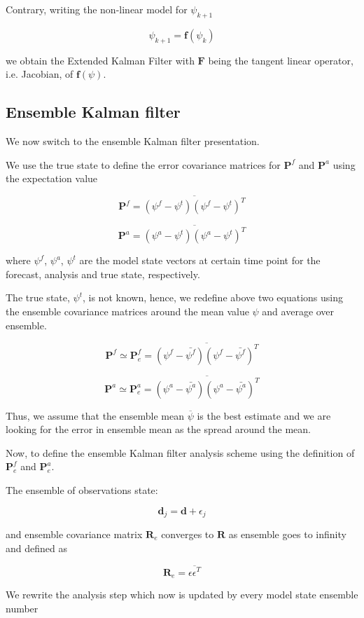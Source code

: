 \documentclass[a4,12pt]{article}
\numberwithin{equation}{section}
\begin{document}
Contrary, writing the non-linear model for $\psi_{k+1}$

$$\psi_{k+1}=\textbf{f}(\psi_{k})$$

we obtain the Extended Kalman Filter with $\textbf{F}$ being the tangent linear operator, i.e. Jacobian, of $\textbf{f}(\psi)$.

\subsection{Ensemble Kalman filter}
We now switch to the ensemble Kalman filter presentation.

We use the true state to define the error covariance matrices for $\textbf{P}^{f}$ and $\textbf{P}^{a}$ using the expectation value 

$$\textbf{P}^{f} = \overline{(\psi^{f}-\psi^{t})(\psi^{f}-\psi^{t})^{T}}$$

$$\textbf{P}^{a} = \overline{(\psi^{a}-\psi^{t})(\psi^{a}-\psi^{t})^{T}}$$

where $\psi ^{f}$, $\psi ^{a}$, $\psi ^{t}$ are the model state vectors at certain time point for the forecast, analysis and true state, respectively.

The true state, $\psi ^{t}$, is not known, hence, we redefine above two equations using the ensemble covariance matrices around the mean value $\psi$ and average over ensemble. 

$$\textbf{P}^{f} \simeq \textbf{P}^{f}_{e} = \overline{(\psi^{f}-\bar{\psi^{f}})(\psi^{f}-\bar{\psi^{f}})^{T}}$$

$$\textbf{P}^{a} \simeq \textbf{P}^{a}_{e}= \overline{ (\psi^{a}-\bar {\psi^{a}})(\psi^{a}-\bar{\psi^{a}})^{T} }$$

Thus, we assume that the ensemble mean $\overline {\psi}$ is the best estimate  and we are looking for the error in ensemble mean as the spread around the mean.

Now, to define the ensemble Kalman filter analysis scheme using the definition of $\textbf{P}^{f}_{e}$ and $\textbf{P}^{a}_{e}$.

The ensemble of observations state:

$$\textbf{d}_{j} = \textbf{d} + \epsilon_{j}$$

and ensemble covariance matrix $\textbf{R}_{e}$ converges to $\textbf{R}$ as ensemble goes to infinity and defined as 

$$\textbf{R}_{e} = \overline{\epsilon \epsilon ^{T}}$$

We rewrite the analysis step which now is updated by every model state ensemble number
\end{document}
